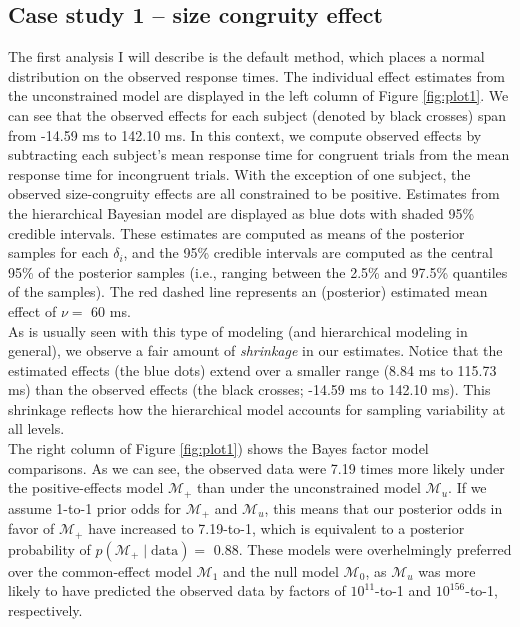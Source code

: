\documentclass[12pt,twoside,a4paper]{article}
\begin{document}
\subsection{Case study 1 -- size congruity effect}

The first analysis I will describe is the default \citet{haaf2017} method, which places a normal distribution on the observed response times. The individual effect estimates from the unconstrained model are displayed in the left column of Figure \ref{fig:plot1}. We can see that the observed effects for each subject (denoted by black crosses) span from -14.59 ms to 142.10 ms. In this context, we compute observed effects by subtracting each subject's mean response time for congruent trials from the mean response time for incongruent trials. With the exception of one subject, the observed size-congruity effects are all constrained to be positive. Estimates from the hierarchical Bayesian model are displayed as blue dots with shaded 95\% credible intervals. These estimates are computed as means of the posterior samples for each \(\delta_i\), and the 95\% credible intervals are computed as the central 95\% of the posterior samples (i.e., ranging between the 2.5\% and 97.5\% quantiles of the samples). The red dashed line represents an (posterior) estimated mean effect of \(\nu=\) 60 ms.\\

As is usually seen with this type of modeling (and hierarchical modeling in general), we observe a fair amount of \emph{shrinkage} in our estimates. Notice that the estimated effects (the blue dots) extend over a smaller range (8.84 ms to 115.73 ms) than the observed effects (the black crosses; -14.59 ms to 142.10 ms). This shrinkage reflects how the hierarchical model accounts for sampling variability at all levels.\\

The right column of Figure \ref{fig:plot1}) shows the Bayes factor model comparisons. As we can see, the observed data were 7.19 times more likely under the positive-effects model \(\mathcal{M}_+\) than under the unconstrained model \(\mathcal{M}_u\). If we assume 1-to-1 prior odds for \(\mathcal{M}_+\) and \(\mathcal{M}_u\), this means that our posterior odds in favor of \(\mathcal{M}_+\) have increased to 7.19-to-1, which is equivalent to a posterior probability of \(p(\mathcal{M}_+ \mid \text{data})=\) 0.88. These models were overhelmingly preferred over the common-effect model \(\mathcal{M}_1\) and the null model \(\mathcal{M}_0\), as \(\mathcal{M}_u\) was more likely to have predicted the observed data by factors of \(10^{11}\)-to-1 and \(10^{156}\)-to-1, respectively.\\
\end{document}
